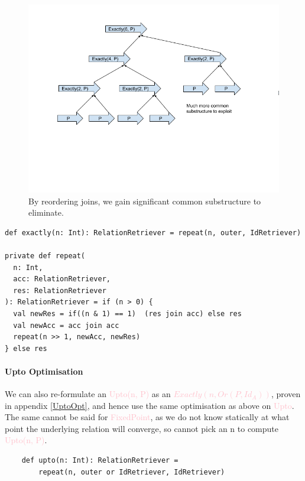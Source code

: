 \documentclass[12pt,a4paper,twoside,openright]{report}
\newcommand\mathName[1]{\textcolor{pink}{#1}}
\renewcommand{\baselinestretch}{1.1}    %
\begin{document}
\begin{figure}[ht]
\centering
  \includegraphics[width=\textwidth]{figs/CommonJoins.png}
  \caption{By reordering joins, we gain significant common substructure to eliminate.}
  \label{fig:CommonJoins}
\end{figure}

\renewcommand{\baselinestretch}{0.8}
\begin{framed}
\begin{verbatim}
def exactly(n: Int): RelationRetriever = repeat(n, outer, IdRetriever)

private def repeat(
  n: Int,
  acc: RelationRetriever,
  res: RelationRetriever
): RelationRetriever = if (n > 0) {
  val newRes = if((n & 1) == 1)  (res join acc) else res
  val newAcc = acc join acc
  repeat(n >> 1, newAcc, newRes)
} else res
\end{verbatim}
\end{framed}
\renewcommand{\baselinestretch}{1.1}

		\paragraph{Upto Optimisation}
			We can also re-formulate an \mathName{Upto(n, P)} as an \mathName{$Exactly(n, Or(P, Id_A))$}, proven in appendix \ref{UptoOpt}, and hence use the same optimisation as above on \mathName{Upto}.  The same cannot be said for \mathName{FixedPoint}, as we do not know statically at what point the underlying relation will converge, so cannot pick an n to compute \mathName{Upto(n, P)}.
			
			\renewcommand{\baselinestretch}{0.8}
			\begin{framed}
			\begin{verbatim}			
    def upto(n: Int): RelationRetriever =
        repeat(n, outer or IdRetriever, IdRetriever)
			\end{verbatim}
			\end{framed}
			\renewcommand{\baselinestretch}{1.1}
\end{document}
